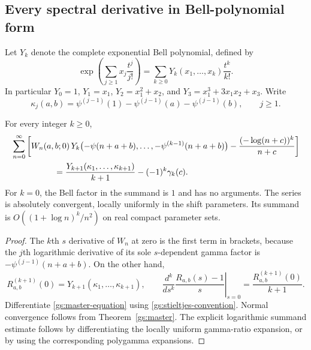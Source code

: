 \subsection{Every spectral derivative in Bell-polynomial form}

Let $Y_k$ denote the complete exponential Bell polynomial, defined by
\begin{equation}\label{gs:Bell-definition}
 \exp\left(\sum_{j\ge1}x_j\frac{t^j}{j!}\right)
 =\sum_{k\ge0}Y_k(x_1,\ldots,x_k)\frac{t^k}{k!}.
\end{equation}
In particular $Y_0=1$, $Y_1=x_1$,
$Y_2=x_1^2+x_2$, and $Y_3=x_1^3+3x_1x_2+x_3$.
Write
\begin{equation}\label{gs:kappa}
 \kappa_j(a,b)=
 \psi^{(j-1)}(1)-\psi^{(j-1)}(a)-\psi^{(j-1)}(b),\qquad j\ge1.
\end{equation}

\begin{theorem}\label{gs:spectral-jets}
For every integer $k\ge0$,
\begin{align}
 &\sum_{n=0}^{\infty}\left[
 W_n(a,b;0)\,
 Y_k\bigl(-\psi(n+a+b),\ldots,-\psi^{(k-1)}(n+a+b)\bigr)
 -\frac{(-\log(n+c))^k}{n+c}\right]\notag\\
 &\hspace{18mm}=
 \frac{Y_{k+1}(\kappa_1,\ldots,\kappa_{k+1})}{k+1}
 -(-1)^k\gamma_k(c).\label{gs:all-index}
\end{align}
For $k=0$, the Bell factor in the summand is $1$ and has no arguments.
The series is absolutely convergent, locally uniformly in the shift
parameters.  Its summand is $O((1+\log n)^k/n^2)$ on real compact
parameter sets.
\end{theorem}

\begin{proof}
The $k$th $s$ derivative of $W_n$ at zero is the first term in brackets,
because the $j$th logarithmic derivative of its sole $s$-dependent gamma
factor is $-\psi^{(j-1)}(n+a+b)$.  On the other hand,
\[
 R_{a,b}^{(k+1)}(0)=Y_{k+1}(\kappa_1,\ldots,\kappa_{k+1}),
 \qquad
 \left.\frac{d^k}{ds^k}\frac{R_{a,b}(s)-1}{s}\right|_{s=0}
 =\frac{R_{a,b}^{(k+1)}(0)}{k+1}.
\]
Differentiate \eqref{gs:master-equation} using
\eqref{gs:stieltjes-convention}.  Normal convergence follows from
Theorem~\ref{gs:master}.  The explicit logarithmic summand estimate follows
by differentiating the locally uniform gamma-ratio expansion, or by
using the corresponding polygamma expansions.
\end{proof}

